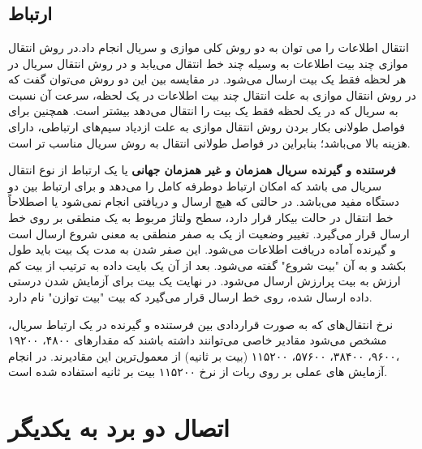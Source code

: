 \section*{}
\begin{latin}
	
\end{latin}

\subsection{ارتباط }
انتقال اطلاعات را می توان به دو روش کلی موازی و سریال انجام داد.در روش انتقال موازی چند بیت اطلاعات به وسیله چند خط انتقال می‌یابد و در روش انتقال سریال در هر لحظه فقط یک بیت ارسال می‌شود. در مقایسه بین این دو روش می‌توان گفت که در روش انتقال موازی به علت انتقال چند بیت اطلاعات در یک لحظه، سرعت آن نسبت به سریال که در یک لحظه فقط یک بیت را انتقال می‌دهد بیشتر است. همچنین برای فواصل طولانی بکار بردن روش انتقال موازی به علت ازدیاد سیم‌های ارتباطی، دارای هزینه بالا می‌باشد؛ بنابراین در فواصل طولانی انتقال به روش سریال مناسب تر است.

\textbf{فرستنده و گیرنده سریال همزمان و غیر همزمان جهانی} یا  یک ارتباط از نوع انتقال سریال می باشد که امکان ارتباط دوطرفه کامل را می‌دهد و برای ارتباط بین دو دستگاه مفید می‌باشد.
در حالتی که هیچ ارسال و دریافتی انجام نمی‌شود یا اصطلاحاً خط انتقال در حالت بیکار  قرار دارد، سطح ولتاژ مربوط به یک منطقی بر روی خط ارسال قرار می‌گیرد. تغییر وضعیت از یک به صفر منطقی به معنی شروع ارسال است و گیرنده آماده دریافت اطلاعات می‌شود. این صفر شدن به مدت یک بیت باید طول بکشد و به آن "بیت شروع" گفته می‌شود. بعد از آن یک بایت داده به ترتیب از بیت کم ارزش  به بیت پرارزش  ارسال می‌شود. در نهایت یک بیت برای آزمایش شدن درستی داده ارسال شده، روی خط ارسال قرار می‌گیرد که بیت "بیت توازن" نام دارد.

نرخ انتقال‌های که به صورت قراردادی بین فرستنده و گیرنده در یک ارتباط سریال، مشخص می‌شود مقادیر خاصی می‌توانند داشته باشند که مقدارهای ۴۸۰۰، ۱۹۲۰۰ ،۹۶۰۰، ۳۸۴۰۰، ۵۷۶۰۰، ۱۱۵۲۰۰ (بیت بر ثانیه) از معمول‌ترین این مقادیرند. در انجام آزمایش های عملی بر روی ربات از نرخ ۱۱۵۲۰۰ بیت بر ثانیه استفاده شده است.



\section{اتصال دو برد به یکدیگر}


